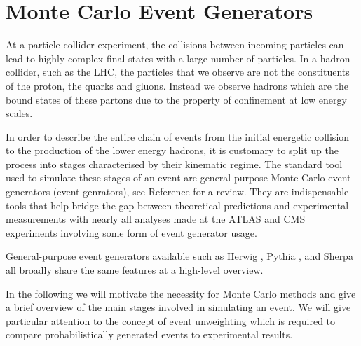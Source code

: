\documentclass[main.tex]{subfiles}
\begin{document}
\chapter{Monte Carlo Event Generators}\label{chap:MC}
    At a particle collider experiment,
    the collisions between incoming particles can lead
    to highly complex final-states with a large number
    of particles. In a hadron collider, such as the LHC,
    the particles that we observe are not the constituents
    of the proton, the quarks and gluons. Instead we observe
    hadrons which are the bound states of these partons
    due to the property of confinement at low energy scales.

    In order to describe the entire chain of events
    from the initial energetic collision to the production
    of the lower energy hadrons, it is customary to
    split up the process into stages characterised by
    their kinematic regime. The standard tool used
    to simulate these stages of an event are general-purpose
    Monte Carlo event generators (event genrators), see
    Reference \cite{Buckley:2011ms} for a review.
    They are indispensable tools that help
    bridge the gap between theoretical predictions
    and experimental measurements with nearly all
    analyses made at the ATLAS and CMS experiments
    involving some form of event generator usage.

    General-purpose event generators available
    such as Herwig \cite{Bahr:2008pv,Bellm:2015jjp},
    Pythia \cite{Sjostrand:2006za,Bierlich:2022pfr},
    and Sherpa \cite{Gleisberg:2008ta,Sherpa:2019gpd} all broadly share 
    the same features at a high-level overview.

    In the following we will motivate the necessity
    for Monte Carlo methods and give a brief overview
    of the main stages involved in simulating an event.
    We will give particular attention to the concept of event
    unweighting which is required to compare probabilistically
    generated events to experimental results.
\end{document}

